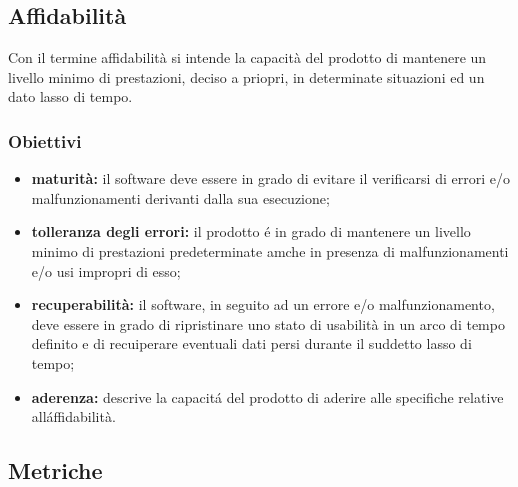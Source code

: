 \subsection{Affidabilità}
Con il termine affidabilità si intende la capacità del prodotto di mantenere un livello minimo di prestazioni, deciso a priopri, in determinate situazioni ed un dato lasso di tempo.
	\subsubsection{Obiettivi}
		\begin{itemize}
			\item \textbf{maturità:} il software deve essere in grado di evitare il verificarsi di errori e/o malfunzionamenti derivanti dalla sua esecuzione;
			\item \textbf{tolleranza degli errori:} il prodotto é in grado di mantenere un livello minimo di prestazioni predeterminate amche in presenza di malfunzionamenti e/o usi impropri di esso;
			\item \textbf{recuperabilità:} il software, in seguito ad un errore e/o malfunzionamento, deve essere in grado di ripristinare uno stato di usabilità in un arco di tempo definito e di recuiperare eventuali dati persi durante il suddetto lasso di tempo;
			\item \textbf{aderenza:} descrive la capacitá del prodotto di aderire alle specifiche relative alláffidabilità.
		\end{itemize}
	\subsection{Metriche}
